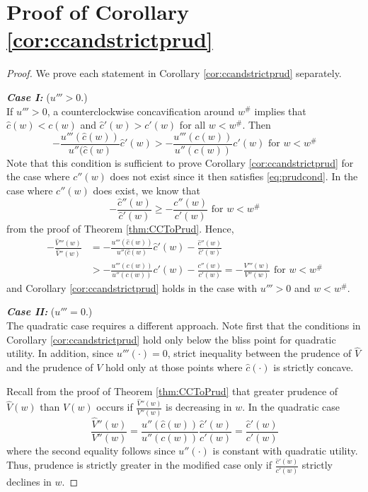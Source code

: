 \section{Proof of Corollary \ref{cor:ccandstrictprud}} \label{app:ccandstrictprud}
\begin{proof}
	We prove each statement in Corollary \ref{cor:ccandstrictprud} separately.
	
	\bigskip
	\noindent \textbf{\textit{Case I:}} ($ u ''' > 0$.) \\
	If $u''' > 0$, a counterclockwise concavification around $w^{\#}$ implies that $\hat{c}(w) < c(w)$ and $\hat{c}'(w) > c'(w)$ for all $w < w^{\#}$. Then \[-\frac{u'''(\hat{c}(w))}{u''(\hat{c}(w)}\hat{c}'(w) > -\frac{u'''({c}(w))}{u''({c}(w))}{c}'(w) \text{ for } w < w^{\#} \]
	Note that this condition is sufficient to prove Corollary \ref{cor:ccandstrictprud} for the case where $c''(w)$ does not exist since it then satisfies \eqref{eq:prudcond}. In the case where $c''(w)$ does exist, we know that
	\[-\frac{\hat{c}''(w)}{\hat{c}'(w)} \geq -\frac{{c}''(w)}{{c}'(w)} \text{ for } w < w^{\#}\]
	from the proof of Theorem \ref{thm:CCToPrud}. Hence,
	\begin{align*}- \frac{\hat{V}'''(w)}{\hat{V}''(w)} &= -\frac{u'''(\hat{c}(w))}{u''(\hat{c}(w)}\hat{c}'(w) - \frac{\hat{c}''(w)}{\hat{c}'(w)}
	\\
	& > -\frac{u'''({c}(w))}{u''({c}(w))}{c}'(w) - \frac{{c}''(w)}{{c}'(w)} = - \frac{{V}'''(w)}{{V}''(w)} \text{ for } w < w^{\#}
	\end{align*}
	and Corollary \ref{cor:ccandstrictprud} holds in the case with $u''' > 0$ and $w < w^{\#}$.
	
	\bigskip
	\noindent \textbf{\textit{Case II:}} ($u''' = 0$.) \\
	The quadratic case requires a different approach. Note first that the conditions in Corollary \ref{cor:ccandstrictprud} hold only below the bliss point for quadratic utility. In addition, since $u'''(\cdot) = 0$, strict inequality between the prudence of $\hat{V}$ and the prudence of $V$ hold only at those points where $\hat{c}(\cdot)$ is strictly concave.
	
	Recall from the proof of Theorem \ref{thm:CCToPrud} that greater prudence of $\hat{V}(w)$ than $V(w)$ occurs if  $\frac{\hat{V}''(w)}{V''(w)}$ is decreasing in $w$. In the quadratic case
	\begin{equation}
	\frac{\hat{V}''(w)}{V''(w)} = \frac{u''(\hat{c}(w))}{u''(c(w))} \frac{\hat{c}'(w)}{c'(w)} = \frac{\hat{c}'(w)}{c'(w)}
	\end{equation}
	where the second equality follows since $u''(\cdot)$ is constant with quadratic utility. Thus, prudence is strictly greater in the modified case only if $ \frac{\hat{c}'(w)}{c'(w)}$ strictly declines in $w$.
\end{proof}

